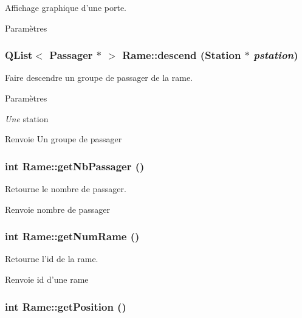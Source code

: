 Affichage graphique d'une porte. 


\begin{DoxyParams}{Paramètres}
\item[{\em }]\end{DoxyParams}
\hypertarget{classRame_a1ed8e8d1cee489bead9aa2b4b0fb6ca6}{
\subsubsection[{descend}]{\setlength{\rightskip}{0pt plus 5cm}QList$<$ {\bf Passager} $\ast$ $>$ Rame::descend ({\bf Station} $\ast$ {\em pstation})}}
\label{classRame_a1ed8e8d1cee489bead9aa2b4b0fb6ca6}


Faire descendre un groupe de passager de la rame. 


\begin{DoxyParams}{Paramètres}
\item[{\em Une}]station \end{DoxyParams}
\begin{DoxyReturn}{Renvoie}
Un groupe de passager 
\end{DoxyReturn}
\hypertarget{classRame_a6a7326b0c9ea2eb2fb2954d6aa8aeabb}{
\subsubsection[{getNbPassager}]{\setlength{\rightskip}{0pt plus 5cm}int Rame::getNbPassager ()}}
\label{classRame_a6a7326b0c9ea2eb2fb2954d6aa8aeabb}


Retourne le nombre de passager. 

\begin{DoxyReturn}{Renvoie}
nombre de passager 
\end{DoxyReturn}
\hypertarget{classRame_aa37e23c49eadb05d1bb5c08a73f7b751}{
\subsubsection[{getNumRame}]{\setlength{\rightskip}{0pt plus 5cm}int Rame::getNumRame ()}}
\label{classRame_aa37e23c49eadb05d1bb5c08a73f7b751}


Retourne l'id de la rame. 

\begin{DoxyReturn}{Renvoie}
id d'une rame 
\end{DoxyReturn}
\hypertarget{classRame_a69a35184fb6ae56508438c553f096dd2}{
\subsubsection[{getPosition}]{\setlength{\rightskip}{0pt plus 5cm}int Rame::getPosition ()}}
\label{classRame_a69a35184fb6ae56508438c553f096dd2}


